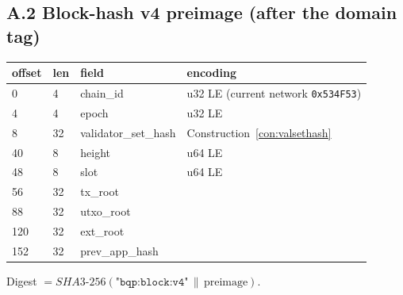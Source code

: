 \documentclass[11pt]{article}
\newcommand{\code}[1]{\texttt{#1}}
\newcommand{\sha}{SHA3\mbox{-}256}
\newcommand{\concat}{\,\|\,}
\theoremstyle{plain}
\theoremstyle{definition}
\theoremstyle{remark}
\begin{document}
\subsection*{A.2 \quad Block-hash v4 preimage (after the domain tag)}
\begin{center}
\begin{tabular}{@{}llll@{}}
\toprule
\textbf{offset} & \textbf{len} & \textbf{field} & \textbf{encoding} \\
\midrule
0   & 4  & chain\_id            & u32 LE (current network \code{0x534F53}) \\
4   & 4  & epoch                & u32 LE \\
8   & 32 & validator\_set\_hash & Construction~\ref{con:valsethash} \\
40  & 8  & height               & u64 LE \\
48  & 8  & slot                 & u64 LE \\
56  & 32 & tx\_root             & \\
88  & 32 & utxo\_root           & \\
120 & 32 & ext\_root            & \\
152 & 32 & prev\_app\_hash      & \\
\bottomrule
\end{tabular}
\end{center}
Digest $= \sha{}(\code{"bqp:block:v4"} \concat \mathrm{preimage})$.
\end{document}
